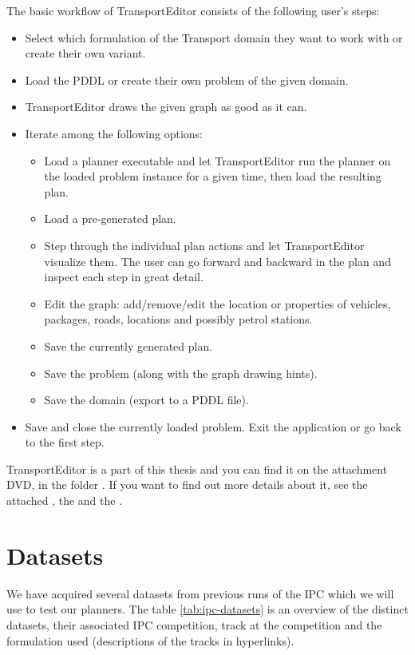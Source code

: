 The basic workflow of TransportEditor consists of the following user's steps:
\begin{itemize}
\item Select which formulation of the Transport domain they want to work with or create their own variant.
\item Load the PDDL or create their own problem of the given domain.
\item TransportEditor draws the given graph as good as it can.
\item Iterate among the following options:
\begin{itemize}
\item Load a planner executable and let TransportEditor run the planner on the loaded problem instance for a given time, then load the resulting plan.
\item Load a pre-generated plan.
\item Step through the individual plan actions and let TransportEditor visualize them.
The user can go forward and backward in the plan and inspect each step in great detail.
\item Edit the graph: add/remove/edit the location or properties of vehicles, packages, roads, locations and possibly petrol stations.
\item Save the currently generated plan.
\item Save the problem (along with the graph drawing hints).
\item Save the domain (export to a PDDL file).
\end{itemize}
\item Save and close the currently loaded problem. Exit the application or go back to the first step.
\end{itemize}

TransportEditor is a part of this thesis and you can find it on the attachment DVD, in the folder . If you want to find out more details about it, see the attached ,
the 
and the .

\section{Datasets}

We have acquired several datasets from previous runs of the IPC which we will use to test our planners.
The table \ref{tab:ipc-datasets} is an overview of the distinct datasets, their associated IPC competition, track at the competition and the formulation used (descriptions of the tracks in hyperlinks).

